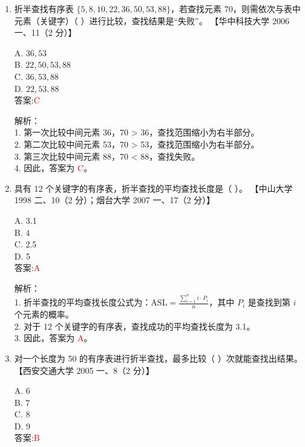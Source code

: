 \documentclass[lang=cn,newtx,10pt,scheme=chinese]{../../../elegantbook}
\begin{document}
\begin{enumerate}
\item 折半查找有序表 $\{5, 8, 10, 22, 36, 50, 53, 88\}$，若查找元素 70，则需依次与表中元素（关键字）（ ）进行比较，查找结果是“失败”。  
    【华中科技大学 2006 一、11（2 分）】  

    A. $36, 53$ \\  
    B. $22, 50, 53, 88$ \\  
    C. $36, 53, 88$ \\  
    D. $22, 53, 88$ \\  

    答案:\textcolor{red}{C}

    解析：\\
    1. 第一次比较中间元素 36，70 > 36，查找范围缩小为右半部分。\\
    2. 第二次比较中间元素 53，70 > 53，查找范围缩小为右半部分。\\
    3. 第三次比较中间元素 88，70 < 88，查找失败。\\
    4. 因此，答案为 \textcolor{red}{C}。\\

\item 具有 12 个关键字的有序表，折半查找的平均查找长度是（ ）。  
    【中山大学 1998 二、10（2 分）；烟台大学 2007 一、17（2 分）】  

    A. 3.1 \\  
    B. 4 \\  
    C. 2.5 \\  
    D. 5 \\  

    答案:\textcolor{red}{A}

    解析：\\
    1. 折半查找的平均查找长度公式为：$\text{ASL} = \frac{\sum_{i=1}^n i \cdot P_i}{n}$，其中 $P_i$ 是查找到第 $i$ 个元素的概率。\\
    2. 对于 12 个关键字的有序表，查找成功的平均查找长度为 3.1。\\
    3. 因此，答案为 \textcolor{red}{A}。\\

\item 对一个长度为 50 的有序表进行折半查找，最多比较（ ）次就能查找出结果。  
    【西安交通大学 2005 一、8（2 分）】  

    A. 6 \\  
    B. 7 \\  
    C. 8 \\  
    D. 9 \\  

    答案:\textcolor{red}{B}


\end{enumerate}
\end{document}
